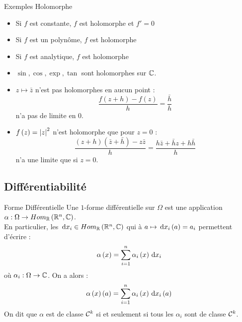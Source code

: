 \documentclass{cours}
\begin{document}
\begin{propositionfr}{Exemples Holomorphe}{}
    \begin{itemize}
        \item Si $f$ est constante, $f$ est holomorphe et $f' = 0$
        \item Si $f$ est un polynôme, $f$ est holomorphe
        \item Si $f$ est analytique, $f$ est holomorphe
        \item $\sin, \cos, \exp, \tan$ sont holomorphes sur $\mathbb{C}$.
        \item $z \mapsto \bar{z}$ n'est pas holomorphes en aucun point : 
        \begin{equation*}
            \frac{f\left(z + h\right) - f\left(z\right)}{h} = \frac{\bar{h}}{h}
        \end{equation*}
        n'a pas de limite en $0$. 
        \item $f\left(z\right) = \left|z\right|^{2}$ n'est holomorphe que pour $z = 0$ : 
        \begin{equation*}
            \frac{\left(z + h\right)\left(\bar{z} + \bar{h}\right) - z\bar{z}}{h} = \frac{h\bar{z} + \bar{h}z + h\bar{h}}{h}
        \end{equation*}
        n'a une limite que si $z = 0$. 
    \end{itemize}
\end{propositionfr}

\subsection{Différentiabilité}
\begin{définition}{Forme Différentielle}{}
    Une $1$-forme différentielle sur $\Omega$ est une application $\alpha : \Omega \to Hom_{\mathbb{R}}\left(\mathbb{R}^{n}, \mathbb{C}\right)$.\\
    En particulier, les ${\rm \, d} x_{i} \in Hom_{\mathbb{R}}\left(\mathbb{R}^{n}, \mathbb{C}\right)$ qui à $a \mapsto {\rm \, d} x_{i}\left(a\right) = a_{i}$ permettent d'écrire : 
    \begin{equation*}
        \alpha\left(x\right) = \sum_{i = 1}^{n} \alpha_{i}\left(x\right){\rm \, d} x_{i}
    \end{equation*}
    où $\alpha_{i} : \Omega \to \mathbb{C}$. On a alors : 
    \begin{equation*}
        \alpha\left(x\right)\left(a\right) = \sum_{i = 1}^{n}\alpha_{i}\left(x\right){\rm \, d} x_{i}\left(a\right)
    \end{equation*}
    On dit que $\alpha$ est de classe $\mathcal{C}^{k}$ si et seulement si tous les $\alpha_{i}$ sont de classe $\mathcal{C}^{k}$.
\end{définition}
\end{document}
